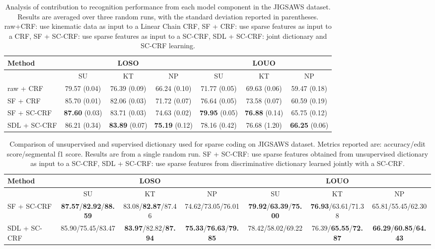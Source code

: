 \documentclass[10pt,twocolumn,letterpaper]{article}
\begin{document}
\begin{table*}[ht!]
\setlength{\tabcolsep}{0.75mm}
\centering
\begin{tabular}{|@{\;}l@{\;}|ccc|ccc|}
\hline
Method & \multicolumn{3}{|c|}{LOSO} & \multicolumn{3}{|c|}{LOUO} \\
\hline
 & SU & KT & NP & SU & KT & NP\\
\hline
raw + CRF & 79.57 (0.04) & 76.39 (0.09) & 66.24 (0.10) & 71.77 (0.05) & 69.63 (0.06) & 59.47 (0.18) \\
SF + CRF & 85.70 (0.01)& 82.06 (0.03) & 71.72 (0.07) & 76.64 (0.05) & 73.58 (0.07) & 60.59 (0.19) \\
SF + SC-CRF & \textbf{87.60} (0.03) & 83.71 (0.03) & 74.63 (0.02) & \textbf{79.95} (0.05) & \textbf{76.88} (0.14) & 65.75 (0.12) \\
SDL + SC-CRF & 86.21 (0.34) & \textbf{83.89} (0.07) & \textbf{75.19} (0.12) & 78.16 (0.42) & 76.68 (1.20) & \textbf{66.25} (0.06) \\
\hline 
\end{tabular}
\caption{Analysis of contribution to recognition performance from each
model component in the JIGSAWS dataset. Results are averaged over three random runs, with the standard deviation reported in parentheses.  raw+CRF: use kinematic data as input to a Linear Chain CRF, SF + CRF: use sparse features  as input to a CRF, SF + SC-CRF: use sparse features  as input to a SC-CRF, SDL + SC-CRF: joint dictionary and SC-CRF learning.}
\label{tab:jigsaws_ablation}
\end{table*}

\begin{table*}
\setlength{\tabcolsep}{0.75mm}
\small
\centering
\begin{tabular}{|@{\;}l@{\;}|ccc|ccc|}
\hline
Method & \multicolumn{3}{|c|}{LOSO} & \multicolumn{3}{|c|}{LOUO} \\
\hline
 & SU & KT & NP & SU & KT & NP\\
\hline
SF + SC-CRF & \textbf{87.57}/\textbf{82.92}/\textbf{88.59} & 83.08/\textbf{82.87}/87.46 & 74.62/73.05/76.01 & \textbf{79.92}/\textbf{63.39}/\textbf{75.00} & \textbf{76.93}/63.61/71.38 & 65.81/55.45/62.30 \\
SDL + SC-CRF & 85.90/75.45/83.47 & \textbf{83.97}/82.82/\textbf{87.94} & \textbf{75.33}/\textbf{76.63}/\textbf{79.85} & 78.42/58.02/69.22 & 76.39/\textbf{65.55}/\textbf{72.87} & \textbf{66.29}/\textbf{60.85}/\textbf{64.43}  \\
\hline
\end{tabular}
\caption{Comparison of unsupervised and supervised dictionary used for sparse coding on JIGSAWS dataset. Metrics reported are: accuracy/edit score/segmental f1 score. Results are from a single random run. SF + SC-CRF: use sparse features  obtained from unsupervised dictionary as input to a SC-CRF, SDL + SC-CRF: use sparse features  from discriminative dictionary learned jointly with a SC-CRF.} 
\label{tab:jigsaws_additional_metrics}
\end{table*}
\end{document}

